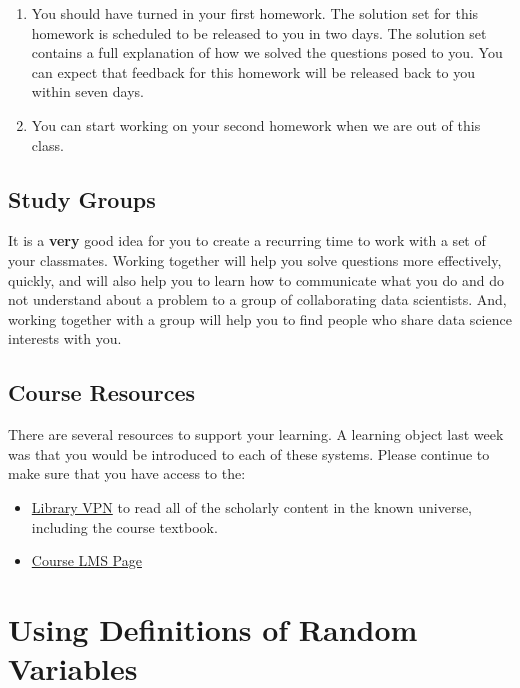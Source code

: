 \documentclass[
]{book}
\providecommand{\tightlist}{%
  \setlength{\itemsep}{0pt}\setlength{\parskip}{0pt}}
\theoremstyle{definition}
\theoremstyle{definition}
\theoremstyle{definition}
\theoremstyle{definition}
\theoremstyle{remark}
\begin{document}
\begin{enumerate}
\def\labelenumi{\arabic{enumi}.}
\tightlist
\item
  You should have turned in your first homework. The solution set for this homework is scheduled to be released to you in two days. The solution set contains a full explanation of how we solved the questions posed to you. You can expect that feedback for this homework will be released back to you within seven days.
\item
  You can start working on your second homework when we are out of this class.
\end{enumerate}

\subsection*{Study Groups}\label{study-groups}

It is a \textbf{very} good idea for you to create a recurring time to work with a set of your classmates. Working together will help you solve questions more effectively, quickly, and will also help you to learn how to communicate what you do and do not understand about a problem to a group of collaborating data scientists. And, working together with a group will help you to find people who share data science interests with you.

\subsection*{Course Resources}\label{course-resources}

There are several resources to support your learning. A learning object last week was that you would be introduced to each of these systems. Please continue to make sure that you have access to the:

\begin{itemize}
\tightlist
\item
  \href{https://www.lib.berkeley.edu/using-the-libraries/vpn}{Library VPN} to read all of the scholarly content in the known universe, including the course textbook.
\item
  \href{https://www.bcourses.berkeley.edu}{Course LMS Page}
\end{itemize}

\section{Using Definitions of Random Variables}\label{using-definitions-of-random-variables}
\end{document}
